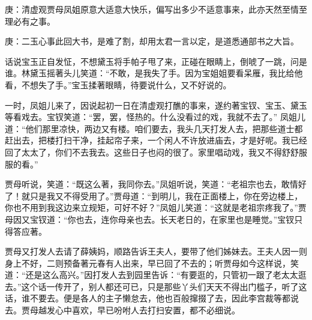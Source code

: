 

\begin{parag}
    \begin{note}庚：清虚观贾母凤姐原意大适意大快乐，偏写出多少不适意事来，此亦天然至情至理必有之事。\end{note}
\end{parag}


\begin{parag}
    \begin{note}庚：二玉心事此回大书，是难了割，却用太君一言以定，是道悉通部书之大旨。\end{note}
\end{parag}


\begin{parag}
    话说宝玉正自发怔，不想黛玉将手帕子甩了来，正碰在眼睛上，倒唬了一跳，问是谁。林黛玉摇著头儿笑道：“不敢，是我失了手。因为宝姐姐要看呆雁，我比给他看，不想失了手。”宝玉揉著眼睛，待要说什么，又不好说的。
\end{parag}


\begin{parag}
    一时，凤姐儿来了，因说起初一日在清虚观打醮的事来，遂约著宝钗、宝玉、黛玉等看戏去。宝钗笑道：“罢，罢，怪热的。什么没看过的戏，我就不去了。” 凤姐儿道：“他们那里凉快，两边又有楼。咱们要去，我头几天打发人去，把那些道士都赶出去，把楼打扫干净，挂起帘子来，一个闲人不许放进庙去，才是好呢。我已经回了太太了，你们不去我去。这些日子也闷的很了。家里唱动戏，我又不得舒舒服服的看。”
\end{parag}


\begin{parag}
    贾母听说，笑道：“既这么著，我同你去。”凤姐听说，笑道：“老祖宗也去，敢情好了！就只是我又不得受用了。”贾母道：“到明儿，我在正面楼上，你在旁边楼上，你也不用到我这边来立规矩，可好不好？”凤姐儿笑道：“这就是老祖宗疼我了。”贾母因又宝钗道：“你也去，连你母亲也去。长天老日的，在家里也是睡觉。”宝钗只得答应著。
\end{parag}


\begin{parag}
    贾母又打发人去请了薛姨妈，顺路告诉王夫人，要带了他们姊妹去。王夫人因一则身上不好，二则预备著元春有人出来，早已回了不去的；听贾母如今这样说，笑道：“还是这么高兴。”因打发人去到园里告诉：“有要逛的，只管初一跟了老太太逛去。”这个话一传开了，别人都还可已，只是那些丫头们天天不得出门槛子，听了这话，谁不要去。便是各人的主子懒怠去，他也百般撺掇了去，因此李宫裁等都说去。贾母越发心中喜欢，早已吩咐人去打扫安置，都不必细说。
\end{parag}


